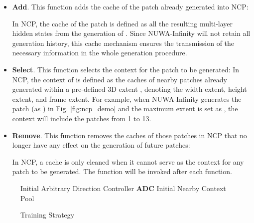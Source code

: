 \documentclass{article}
\begin{document}
\begin{itemize}[leftmargin=*]

\item \textbf{Add}. This function adds the cache  of the patch  already generated into NCP:

In NCP, the cache  of the patch  is defined as all the resulting multi-layer hidden states from the generation of . Since NUWA-Infinity will not retain all generation history, this cache mechanism ensures the transmission of the necessary information in the whole generation procedure.
\item \textbf{Select}. This function selects the context  for the patch  to be generated:
In NCP, the context  of  is defined as the caches of nearby patches already generated within a pre-defined 3D extent , denoting the width extent, height extent, and frame extent. For example, when NUWA-Infinity generates the  patch (as ) in Fig. \ref{fig:ncp_demo} and the maximum extent is set as , the context will include the patches from 1 to 13.




\item \textbf{Remove}. This function removes the caches of those patches in NCP that no longer have any effect on the generation of future patches:

In NCP, a cache is only cleaned when it cannot serve as the context for any patch to be generated. The  function will be invoked after each  function.

\end{itemize}








































\begin{wrapfigure}[12]{R}{0.5\textwidth}
\vspace{-0.17in}
\begin{minipage}{1\linewidth}
\begin{algorithm}[H]\label{alg:training}
\SetAlgoNoLine
\caption{Training Strategy}

Initial Arbitrary Direction Controller \textbf{ADC}\;
Initial Nearby Context Pool  \;
\;
\end{algorithm}
\end{minipage}
\end{wrapfigure}
\end{document}

